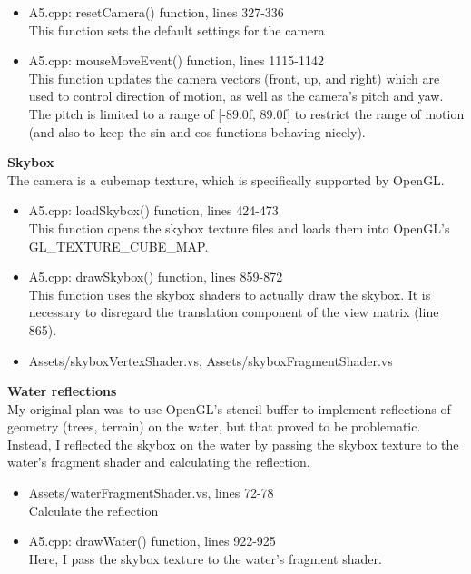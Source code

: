 \documentclass{article}
\begin{document}
	\begin{itemize}
	\item A5.cpp: resetCamera() function, lines 327-336 \\
	This function sets the default settings for the camera
	\item A5.cpp: mouseMoveEvent() function, lines 1115-1142 \\
	This function updates the camera vectors (front, up, and right) which are used to control direction of motion, as well as the camera's pitch and yaw. The pitch is limited to a range of [-89.0f, 89.0f] to restrict the range of motion (and also to keep the sin and cos functions behaving nicely).
	\end{itemize}

	\large\noindent\textbf{Skybox}
	\normalsize
	\\

	The camera is a cubemap texture, which is specifically supported by OpenGL.
	\\

	\begin{itemize}
	\item A5.cpp: loadSkybox() function, lines 424-473 \\
	This function opens the skybox texture files and loads them into OpenGL's GL\_TEXTURE\_CUBE\_MAP.
	\item A5.cpp: drawSkybox() function, lines 859-872 \\
	This function uses the skybox shaders to actually draw the skybox. It is necessary to disregard the translation component of the view matrix (line 865).
	\item Assets/skyboxVertexShader.vs, Assets/skyboxFragmentShader.vs
	\end{itemize}

	\large\noindent\textbf{Water reflections}
	\normalsize
	\\

	My original plan was to use OpenGL's stencil buffer to implement reflections of geometry (trees, terrain) on the water, but that proved to be problematic. Instead, I reflected the skybox on the water by passing the skybox texture to the water's fragment shader and calculating the reflection.
	\\

	\begin{itemize}
	\item Assets/waterFragmentShader.vs, lines 72-78 \\
	Calculate the reflection
	\item A5.cpp: drawWater() function, lines 922-925 \\
	Here, I pass the skybox texture to the water's fragment shader.
	\end{itemize}
\end{document}

